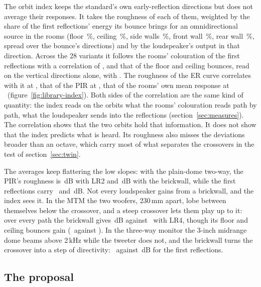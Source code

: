 \documentclass[11pt,a4paper]{article}
\begin{document}
The orbit index keeps the standard's own early-reflection directions but does not average their
responses. It takes the roughness of each of them, weighted by the share of the first reflections'
energy its bounce brings for an omnidirectional source in the rooms (floor \nlibShareFloor\,\%, ceiling
\nlibShareCeiling\,\%, side walls \nlibShareSide\,\%, front wall \nlibShareFront\,\%, rear wall
\nlibShareRear\,\%, spread over the bounce's directions) and by the loudspeaker's output in that direction.
Across the 28 variants it follows the rooms' colouration of the first reflections with a correlation
of \nlibCorrIndex, and that of the floor and ceiling bounces, read on the vertical directions alone, with
\nlibCorrIndexVert. The roughness of the ER curve correlates with it at \nlibCorrEr, that of the PIR at
\nlibCorrPir, that of the rooms' own mean response at \nlibCorrRoom\ (figure~\ref{fig:library-index}). Both
sides of the correlation are the same kind of quantity: the index reads on the orbits what the rooms'
colouration reads path by path, what the loudspeaker sends into the reflections
(section~\ref{sec:measures}). The correlation shows that the two orbits hold that information. It does
not show that the index predicts what is heard. Its roughness also misses the deviations broader than an
octave, which carry most of what separates the crossovers in the test of section~\ref{sec:twin}.

The averages keep flattering the low slopes: with the plain-dome two-way, the PIR's roughness is
\nlibDomeLrTwoPir\,dB with LR2 and \nlibDomeFirPir\,dB with the brickwall, while the first reflections carry
\nlibDomeLrTwoRefl\ and \nlibDomeFirRefl\,dB. Not every loudspeaker gains from a brickwall, and the index sees
it. In the MTM the two woofers, 230\,mm apart, lobe between themselves below the crossover, and a steep
crossover lets them play up to it: over every path the brickwall gives \nlibMtmFirAll\,dB against
\nlibMtmLrFourAll\ with LR4, though its floor and ceiling bounces gain (\nlibMtmFirVert\ against
\nlibMtmLrFourVert). In the three-way monitor the 3-inch midrange dome beams above 2\,kHz while the tweeter
does not, and the brickwall turns the crossover into a step of directivity: \nlibMonitorFirRefl\ against
\nlibMonitorLrFourRefl\,dB for the first reflections.

\subsection{The proposal}
\end{document}
